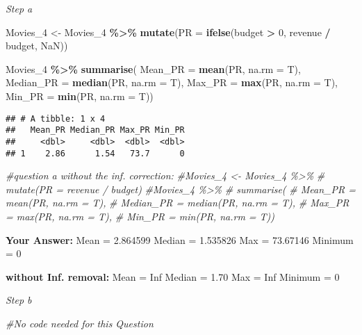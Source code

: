 \documentclass[
]{article}
\newenvironment{Shaded}{\begin{snugshade}}{\end{snugshade}}
\newcommand{\AttributeTok}[1]{\textcolor[rgb]{0.13,0.29,0.53}{#1}}
\newcommand{\CommentTok}[1]{\textcolor[rgb]{0.56,0.35,0.01}{\textit{#1}}}
\newcommand{\ConstantTok}[1]{\textcolor[rgb]{0.56,0.35,0.01}{#1}}
\newcommand{\DecValTok}[1]{\textcolor[rgb]{0.00,0.00,0.81}{#1}}
\newcommand{\FunctionTok}[1]{\textcolor[rgb]{0.13,0.29,0.53}{\textbf{#1}}}
\newcommand{\NormalTok}[1]{#1}
\newcommand{\OtherTok}[1]{\textcolor[rgb]{0.56,0.35,0.01}{#1}}
\newcommand{\SpecialCharTok}[1]{\textcolor[rgb]{0.81,0.36,0.00}{\textbf{#1}}}
\begin{document}
\emph{Step a}

\begin{Shaded}
\begin{Highlighting}[]
\NormalTok{Movies\_4 }\OtherTok{\textless{}{-}}\NormalTok{ Movies\_4 }\SpecialCharTok{\%\textgreater{}\%}
  \FunctionTok{mutate}\NormalTok{(}\AttributeTok{PR =} \FunctionTok{ifelse}\NormalTok{(budget }\SpecialCharTok{\textgreater{}} \DecValTok{0}\NormalTok{, revenue }\SpecialCharTok{/}\NormalTok{ budget, }\ConstantTok{NaN}\NormalTok{))}

\NormalTok{Movies\_4 }\SpecialCharTok{\%\textgreater{}\%}
  \FunctionTok{summarise}\NormalTok{(}
    \AttributeTok{Mean\_PR =} \FunctionTok{mean}\NormalTok{(PR, }\AttributeTok{na.rm =}\NormalTok{ T),}
    \AttributeTok{Median\_PR =} \FunctionTok{median}\NormalTok{(PR, }\AttributeTok{na.rm =}\NormalTok{ T),}
    \AttributeTok{Max\_PR =} \FunctionTok{max}\NormalTok{(PR, }\AttributeTok{na.rm =}\NormalTok{ T),}
    \AttributeTok{Min\_PR =} \FunctionTok{min}\NormalTok{(PR, }\AttributeTok{na.rm =}\NormalTok{ T))}
\end{Highlighting}
\end{Shaded}

\begin{verbatim}
## # A tibble: 1 x 4
##   Mean_PR Median_PR Max_PR Min_PR
##     <dbl>     <dbl>  <dbl>  <dbl>
## 1    2.86      1.54   73.7      0
\end{verbatim}

\begin{Shaded}
\begin{Highlighting}[]
\CommentTok{\#question a without the inf. correction:}
\CommentTok{\#Movies\_4 \textless{}{-} Movies\_4 \%\textgreater{}\%}
\CommentTok{\#  mutate(PR = revenue / budget)}
\CommentTok{\#Movies\_4 \%\textgreater{}\%}
\CommentTok{\#  summarise(}
\CommentTok{\#    Mean\_PR = mean(PR, na.rm = T),}
\CommentTok{\#    Median\_PR = median(PR, na.rm = T),}
\CommentTok{\#    Max\_PR = max(PR, na.rm = T),}
\CommentTok{\#    Min\_PR = min(PR, na.rm = T))}
\end{Highlighting}
\end{Shaded}

\textbf{Your Answer:} Mean = 2.864599 Median = 1.535826 Max = 73.67146
Minimum = 0

\textbf{without Inf. removal:} Mean = Inf Median = 1.70 Max = Inf
Minimum = 0

\emph{Step b}

\begin{Shaded}
\begin{Highlighting}[]
\CommentTok{\#No code needed for this Question}
\end{Highlighting}
\end{Shaded}
\end{document}
